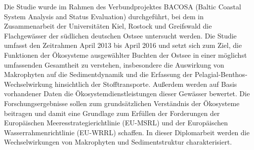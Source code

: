 Die Studie wurde im Rahmen des Verbundprojektes BACOSA (Baltic Coastal System Analysis and Status Evaluation) durchgeführt, bei dem in Zusammenarbeit der Universitäten Kiel, Rostock und Greifswald die Flachgewässer der südlichen deutschen Ostsee untersucht werden. Die Studie umfasst den Zeitrahmen April 2013 bis April 2016 und setzt sich zum Ziel, die Funktionen der Ökosysteme ausgewählter Buchten der Ostsee in einer möglichst umfassenden Gesamtheit zu verstehen, insbesondere die Auswirkung von Makrophyten auf die Sedimentdynamik und die Erfassung der Pelagial-Benthos-Wechselwirkung hinsichtlich der Stofftransporte. Außerdem werden auf Basis vorhandener Daten die Ökosystemdienstleistungen dieser Gewässer bewertet. Die Forschungsergebnisse sollen zum grundsätzlichen Verständnis der Ökosysteme beitragen und damit eine Grundlage zum Erfüllen der Forderungen der Europäischen Meeresstrategierichtlinie (EU-MSRL) und der Europäischen Wasserrahmenrichtlinie (EU-WRRL) schaffen. In dieser Diplomarbeit werden die Wechselwirkungen von Makrophyten und Sedimentstruktur charakterisiert.\\

